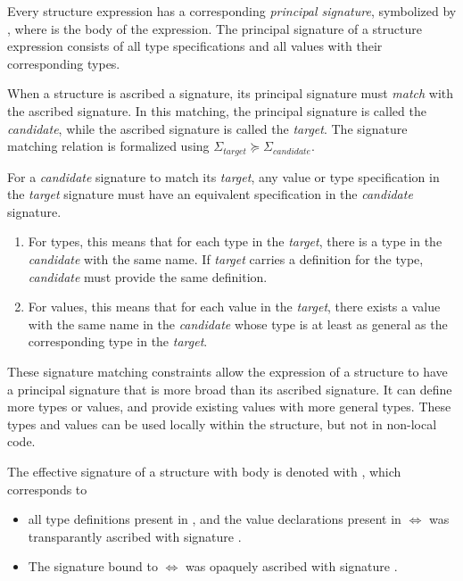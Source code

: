 Every structure expression has a corresponding \emph{principal signature}, symbolized by , where  is the body of the  expression.
The principal signature of a structure expression consists of all type specifications and all values with their corresponding types.

When a structure is ascribed a signature, its principal signature must \emph{match} with the ascribed signature.
In this matching, the principal signature is called the \emph{candidate}, while the ascribed signature is called the \emph{target}.
The signature matching relation is formalized using $\mathit{\Sigma_{target}}\succeq\mathit{\Sigma_{candidate}}$.

For a \emph{candidate} signature to match its \emph{target}, any value or type specification in the \emph{target} signature must have an equivalent specification in the \emph{candidate} signature.
\begin{enumerate}
\item For types, this means that for each type in the \emph{target}, there is a type in the \emph{candidate} with the same name.
If \emph{target} carries a definition for the type, \emph{candidate} must provide the same definition.
\item For values, this means that for each value in the \emph{target}, there exists a value with the same name in the \emph{candidate} whose type is at least as general as the corresponding type in the \emph{target}.
\end{enumerate}

These signature matching constraints allow the expression of a structure to have a principal signature that is more broad than its ascribed signature.
It can define more types or values, and provide existing values with more general types.
These types and values can be used locally within the structure, but not in non-local code.

The effective signature of a structure  with body  is denoted with , which corresponds to
\begin{itemize}
\item all type definitions present in , and the value declarations present in  $\Leftrightarrow$  was transparantly ascribed with signature .
\item The signature bound to  $\Leftrightarrow$  was opaquely ascribed with signature .
\end{itemize}

